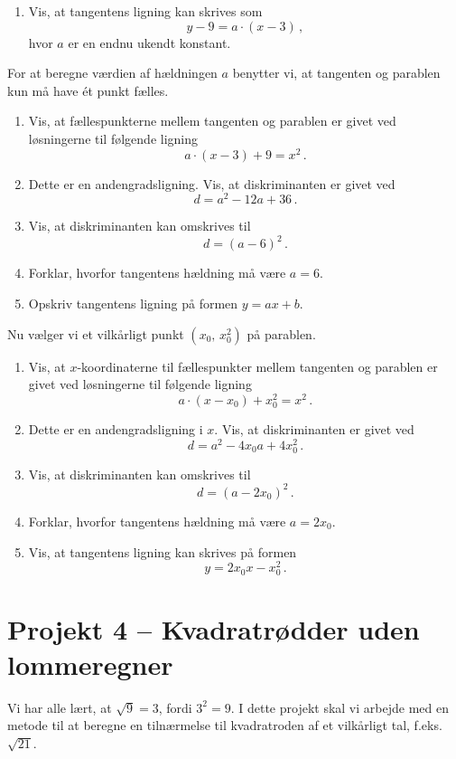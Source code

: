 \documentclass[12pt,oneside,a4paper]{article}
\theoremstyle{plain}
\begin{document}
\begin{enumerate}[label=(\alph*)]
    \item Vis, at tangentens ligning kan skrives som 
        \[
            y-9 = a\cdot(x-3)\,,
        \]
    hvor $a$ er en endnu ukendt konstant.
\end{enumerate}
For at beregne værdien af hældningen $a$ benytter vi, at tangenten og parablen
kun må have ét punkt fælles.

\begin{enumerate}[label=(\alph*), resume]
    \item Vis, at fællespunkterne mellem tangenten og parablen er givet
        ved løsningerne til følgende ligning
        \[
            a\cdot(x-3) + 9 = x^2 \,.
        \]
    \item Dette er en andengradsligning. Vis, at diskriminanten er givet ved
        \[
            d = a^2 - 12a + 36 \,.
        \]
    \item Vis, at diskriminanten kan omskrives til
        \[
            d = (a-6)^2 \,.
        \]
    \item Forklar, hvorfor tangentens hældning må være $a=6$.
    \item Opskriv tangentens ligning på formen $y=ax+b$.
\end{enumerate}

Nu vælger vi et vilkårligt punkt $(x_0,\, x_0^2)$ på parablen.
\begin{enumerate}[label=(\alph*), resume]
    \item Vis, at $x$-koordinaterne til fællespunkter mellem tangenten og
        parablen er givet ved løsningerne til følgende ligning
        \[
            a\cdot(x-x_0) + x_0^2 = x^2 \,.
        \]
    \item Dette er en andengradsligning i $x$. Vis, at diskriminanten er givet ved
        \[
            d = a^2 - 4x_0a + 4x_0^2 \,.
        \]
    \item Vis, at diskriminanten kan omskrives til
        \[
            d = (a-2x_0)^2 \,.
        \]
    \item Forklar, hvorfor tangentens hældning må være $a=2x_0$.
    \item Vis, at tangentens ligning kan skrives på formen 
        \[
            y=2x_0x - x_0^2 \,.
        \]

\end{enumerate}


\section*{Projekt 4 -- Kvadratrødder uden lommeregner}
Vi har alle lært, at $\sqrt{9} = 3$, fordi $3^2 = 9$. I dette projekt skal vi
arbejde med en metode til at beregne en tilnærmelse til kvadratroden af et
vilkårligt tal, f.eks.
$\sqrt{21}$.
\end{document}
